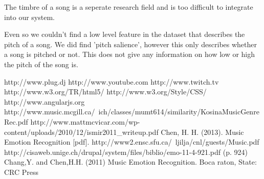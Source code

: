 \documentclass[10pt,a4paper]{article}
\begin{document}
The timbre of a song is a seperate research field and is too difficult to integrate into our system.

Even so we couldn't find a low level feature in the dataset that describes the pitch of a song.
We did find 'pitch salience', however this only describes whether a song is pitched or not.
This does not give any information on how low or high the pitch of the song is.

%
%

\begin{thebibliography}{10}
 http://www.plug.dj
 http://www.youtube.com
 http://www.twitch.tv
 http://www.w3.org/TR/html5/
 http://www.w3.org/Style/CSS/
 http://www.angularjs.org
 http://www.music.mcgill.ca/~ich/classes/mumt614/similarity/KosinaMusicGenreRec.pdf
 http://www.mattmcvicar.com/wp-content/uploads/2010/12/ismir2011\_writeup.pdf
 Chen, H. H. (2013). Music Emotion Recognition [pdf]. http://www2.ensc.sfu.ca/~ljilja/cnl/guests/Music.pdf
 http://cisaweb.unige.ch/drupal/system/files/biblio/emo-11-4-921.pdf (p. 924)
 Chang,Y. and Chen,H.H. (2011) Music Emotion Recognition. Boca raton, State: CRC Press %

\end{thebibliography}
\end{document}
